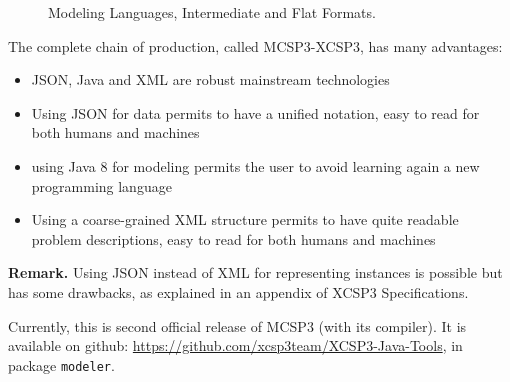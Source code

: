 \documentclass[10pt]{article}
\begin{document}
\begin{figure}[p]
\begin{center}
\end{center}
\caption{Modeling Languages, Intermediate and Flat Formats.\label{fig:modfor}}
 \end{figure}



\noindent The complete chain of production, called MCSP3-XCSP3, has many advantages:
\begin{itemize}
\item JSON, Java and XML are robust mainstream technologies
\item Using JSON for data permits to have a unified notation, easy to read for both humans and machines
\item using Java 8 for modeling permits the user to avoid learning again a new programming language
\item Using a coarse-grained XML structure permits to have quite readable problem descriptions, easy to read for both humans and machines
\end{itemize}

{\bf Remark.} Using JSON instead of XML for representing instances is possible but has some drawbacks, as explained in an appendix of XCSP3 Specifications. 

\bigskip
Currently, this is second official release of MCSP3 (with its compiler).
It is available on github: \href{https://github.com/xcsp3team/XCSP3-Java-Tools}{https://github.com/xcsp3team/XCSP3-Java-Tools}, in package \texttt{modeler}.
    
\end{document}
